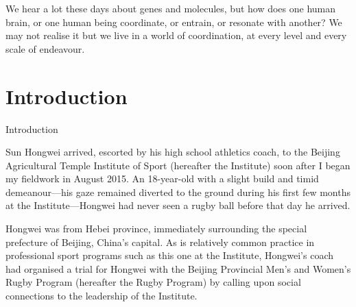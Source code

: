 
\begin{savequote}[8cm]

    We hear a lot these days about genes and molecules, but how does one human brain, or one human being coordinate, or entrain, or resonate with another?  We may not realise it but we live in a world of coordination, at every level and every scale of endeavour.

\end{savequote}

\chapter{\label{introduction}Introduction}



\minitoc

Introduction

Sun Hongwei arrived, escorted by his high school athletics coach, to the Beijing Agricultural Temple Institute of Sport (hereafter the Institute) soon after I began my fieldwork in August 2015.  An 18-year-old with a slight build and timid demeanour---his gaze remained diverted to the ground during his first few months at the Institute---Hongwei had never seen a rugby ball before that day he arrived.

Hongwei was from Hebei province, immediately surrounding the special prefecture of Beijing, China's capital.  As is relatively common practice in professional sport programs such as this one at the Institute, Hongwei's coach had organised a trial for Hongwei with the Beijing Provincial Men’s and Women's Rugby Program (hereafter the Rugby Program) by calling upon social connections to the leadership of the Institute.

